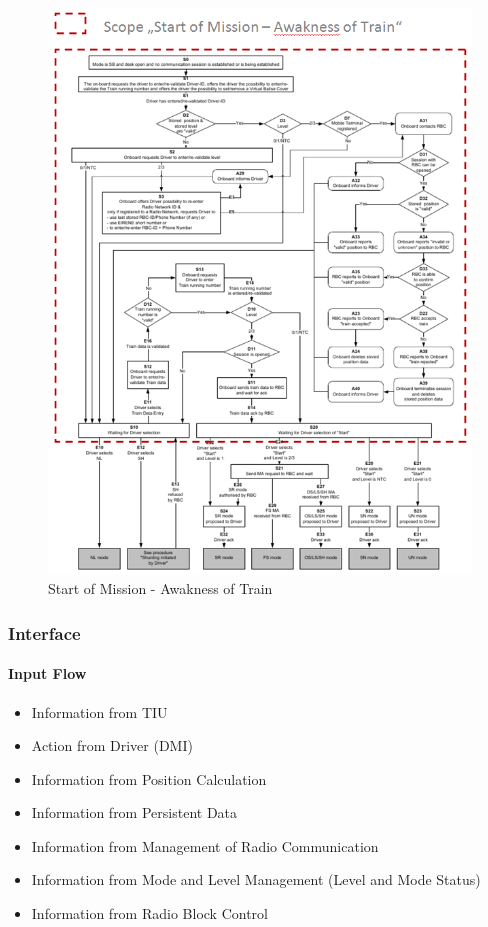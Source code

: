 \begin{figure}
\centering
\includegraphics[scale=0.8]{images/SoMAwaknessoftrain}
\caption{Start of Mission - Awakness of Train}
\label{Start of Mission - Awakness of Train}
\end{figure}

\subsubsection{Interface}
\paragraph{Input Flow}
\begin{itemize}
\item Information from TIU
\item Action from Driver (DMI)
\item Information from Position Calculation
\item Information from Persistent Data
\item Information from Management of Radio Communication
\item Information from Mode and Level Management (Level and Mode Status)
\item Information from Radio Block Control
\end{itemize}

